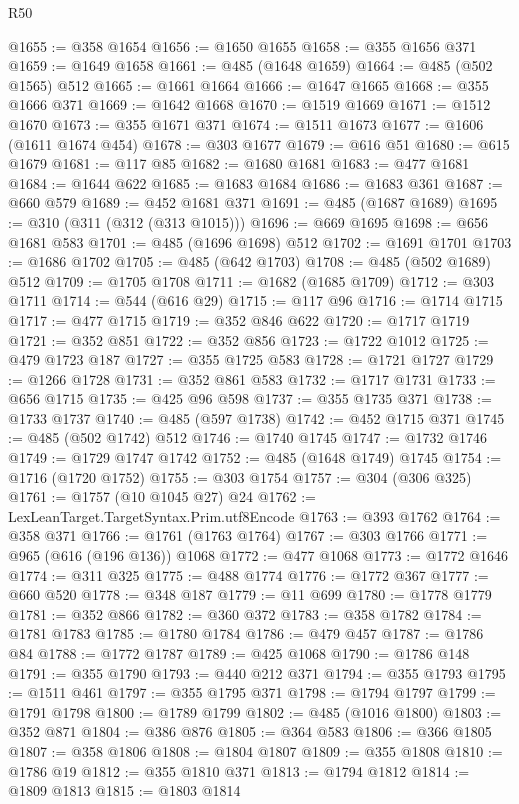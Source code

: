 \begin{lexlean}{R50}
\begin{coremodule}
@1655 := @358 @1654
@1656 := @1650 @1655
@1658 := @355 @1656 @371
@1659 := @1649 @1658
@1661 := @485 (@1648 @1659)
@1664 := @485 (@502 @1565) @512
@1665 := @1661 @1664
@1666 := @1647 @1665
@1668 := @355 @1666 @371
@1669 := @1642 @1668
@1670 := @1519 @1669
@1671 := @1512 @1670
@1673 := @355 @1671 @371
@1674 := @1511 @1673
@1677 := @1606 (@1611 @1674 @454)
@1678 := @303 @1677
@1679 := @616 @51
@1680 := @615 @1679
@1681 := @117 @85
@1682 := @1680 @1681
@1683 := @477 @1681
@1684 := @1644 @622
@1685 := @1683 @1684
@1686 := @1683 @361
@1687 := @660 @579
@1689 := @452 @1681 @371
@1691 := @485 (@1687 @1689)
@1695 := @310 (@311 (@312 (@313 @1015)))
@1696 := @669 @1695
@1698 := @656 @1681 @583
@1701 := @485 (@1696 @1698) @512
@1702 := @1691 @1701
@1703 := @1686 @1702
@1705 := @485 (@642 @1703)
@1708 := @485 (@502 @1689) @512
@1709 := @1705 @1708
@1711 := @1682 (@1685 @1709)
@1712 := @303 @1711
@1714 := @544 (@616 @29)
@1715 := @117 @96
@1716 := @1714 @1715
@1717 := @477 @1715
@1719 := @352 @846 @622
@1720 := @1717 @1719
@1721 := @352 @851
@1722 := @352 @856
@1723 := @1722 @1012
@1725 := @479 @1723 @187
@1727 := @355 @1725 @583
@1728 := @1721 @1727
@1729 := @1266 @1728
@1731 := @352 @861 @583
@1732 := @1717 @1731
@1733 := @656 @1715
@1735 := @425 @96 @598
@1737 := @355 @1735 @371
@1738 := @1733 @1737
@1740 := @485 (@597 @1738)
@1742 := @452 @1715 @371
@1745 := @485 (@502 @1742) @512
@1746 := @1740 @1745
@1747 := @1732 @1746
@1749 := @1729 @1747 @1742
@1752 := @485 (@1648 @1749) @1745
@1754 := @1716 (@1720 @1752)
@1755 := @303 @1754
@1757 := @304 (@306 @325)
@1761 := @1757 (@10 @1045 @27) @24
@1762 := LexLeanTarget.TargetSyntax.Prim.utf8Encode
@1763 := @393 @1762
@1764 := @358 @371
@1766 := @1761 (@1763 @1764)
@1767 := @303 @1766
@1771 := @965 (@616 (@196 @136)) @1068
@1772 := @477 @1068
@1773 := @1772 @1646
@1774 := @311 @325
@1775 := @488 @1774
@1776 := @1772 @367
@1777 := @660 @520
@1778 := @348 @187
@1779 := @11 @699
@1780 := @1778 @1779
@1781 := @352 @866
@1782 := @360 @372
@1783 := @358 @1782
@1784 := @1781 @1783
@1785 := @1780 @1784
@1786 := @479 @457
@1787 := @1786 @84
@1788 := @1772 @1787
@1789 := @425 @1068
@1790 := @1786 @148
@1791 := @355 @1790
@1793 := @440 @212 @371
@1794 := @355 @1793
@1795 := @1511 @461
@1797 := @355 @1795 @371
@1798 := @1794 @1797
@1799 := @1791 @1798
@1800 := @1789 @1799
@1802 := @485 (@1016 @1800)
@1803 := @352 @871
@1804 := @386 @876
@1805 := @364 @583
@1806 := @366 @1805
@1807 := @358 @1806
@1808 := @1804 @1807
@1809 := @355 @1808
@1810 := @1786 @19
@1812 := @355 @1810 @371
@1813 := @1794 @1812
@1814 := @1809 @1813
@1815 := @1803 @1814

\end{coremodule}
\end{lexlean}
